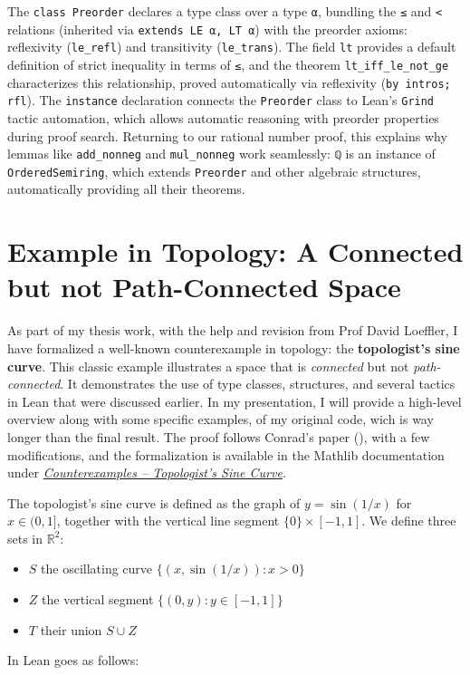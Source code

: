The \lstinline[language=lean]|class Preorder| declares a type class over a type
\lstinline[language=lean]|α|, bundling the \lstinline[language=lean]|≤|
and \lstinline[language=lean]|<| relations
(inherited via \lstinline[language=lean]|extends LE α, LT α|)
with the preorder axioms: reflexivity (\lstinline[language=lean]|le_refl|)
and transitivity (\lstinline[language=lean]|le_trans|).
The field \lstinline[language=lean]|lt| provides a default definition of strict
inequality in terms of \lstinline[language=lean]|≤|,
and the theorem \lstinline[language=lean]|lt_iff_le_not_ge| characterizes this relationship,
proved automatically via reflexivity (\lstinline[language=lean]|by intros; rfl|).
The \lstinline[language=lean]|instance| declaration connects the \lstinline[language=lean]|Preorder|
class to Lean's \lstinline[language=lean]|Grind| tactic automation, which allows automatic
reasoning with preorder properties during proof search.
Returning to our rational number proof, this explains why lemmas
like \lstinline[language=lean]|add_nonneg| and \lstinline[language=lean]|mul_nonneg|
work seamlessly: \lstinline[language=lean]|ℚ| is an instance of
\lstinline[language=lean]|OrderedSemiring|, which extends
\lstinline[language=lean]|Preorder| and other algebraic structures,
automatically providing all their theorems.

\section{Example in Topology: A Connected but not Path-Connected Space}

As part of my thesis work, with the help and revision from Prof David Loeffler, 
I have formalized a well-known counterexample in topology: the \textbf{topologist’s sine curve}.
This classic example illustrates a space that is \emph{connected} but not \emph{path-connected}.
It demonstrates the use of type classes, structures, and several tactics in Lean that were discussed earlier.
In my presentation, I will provide a high-level overview along with some specific examples, 
of my original code, wich is way longer than the final result.
The proof follows Conrad’s paper (\cite{Conrad_connnotpathconn}), with a few modifications, and the formalization is available in the Mathlib documentation under \href{https://leanprover-community.github.io/mathlib4_docs/Counterexamples/TopologistsSineCurve.html}{\emph{Counterexamples – Topologist’s Sine Curve}}.

The topologist's sine curve is defined as the graph of $y = \sin(1/x)$ for $x \in (0, 1]$,
together with the vertical line segment $\{0\} \times [-1, 1]$.
We define three sets in $\mathbb{R}^2$:
\begin{itemize}
  \item $S$ the oscillating curve $\{(x, \sin(1/x)) : x > 0\}$
  \item $Z$ the vertical segment $\{(0, y) : y \in [-1, 1]\}$   
  \item $T$ their union $S \cup Z$
\end{itemize}
In Lean goes as follows:

